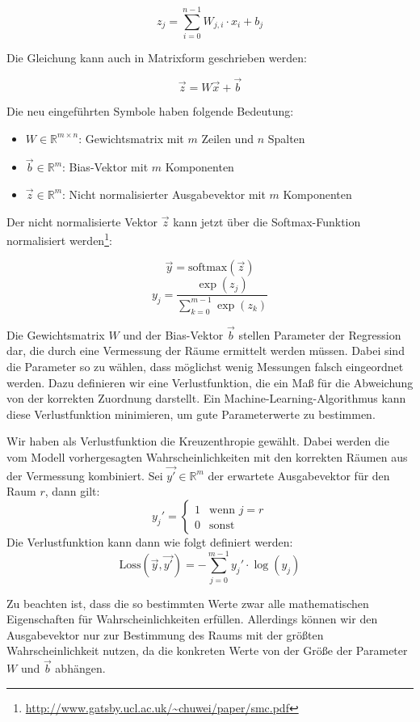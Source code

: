 $$ z_j = \sum_{i=0}^{n-1} W_{j,i} \cdot x_i + b_j $$

Die Gleichung kann auch in Matrixform geschrieben werden:

$$ \vec{z} = W \vec{x} + \vec{b} $$

Die neu eingeführten Symbole haben folgende Bedeutung:
\begin{itemize}
	\item $W \in \mathbb{R}^{m \times n}$: Gewichtsmatrix mit $m$ Zeilen und $n$ Spalten
	\item $\vec{b} \in \mathbb{R}^m$: Bias-Vektor mit $m$ Komponenten
	\item $\vec{z} \in \mathbb{R}^m$: Nicht normalisierter Ausgabevektor mit $m$ Komponenten
\end{itemize}

Der nicht normalisierte Vektor $\vec{z}$ kann jetzt über die Softmax-Funktion normalisiert
werden\footnote{\url{http://www.gatsby.ucl.ac.uk/~chuwei/paper/smc.pdf}}:

$$ \vec{y} = \text{softmax}(\vec{z}) $$
$$ y_j = \frac{\exp(z_j)}{\sum_{k=0}^{m-1} \exp(z_k) } $$

Die Gewichtsmatrix $W$ und der Bias-Vektor $\vec{b}$ stellen Parameter der Regression dar,
die durch eine Vermessung der Räume ermittelt werden müssen. Dabei sind die Parameter so
zu wählen, dass möglichst wenig Messungen falsch eingeordnet werden. Dazu definieren wir
eine Verlustfunktion, die ein Maß für die Abweichung von der korrekten Zuordnung darstellt.
Ein Machine-Learning-Algorithmus kann diese Verlustfunktion minimieren, um
gute Parameterwerte zu bestimmen.

Wir haben als Verlustfunktion die Kreuzenthropie gewählt. Dabei werden die vom Modell vorhergesagten
Wahrscheinlichkeiten mit den korrekten Räumen aus der Vermessung kombiniert.
Sei $\vec{y'} \in \mathbb{R}^m$ der erwartete Ausgabevektor für den Raum $r$, dann gilt:
\[
y_j' = 
\begin{cases}
	1 & \text{wenn } j = r  \\ 
	0 & \text{sonst}
\end{cases}
\]
Die Verlustfunktion kann dann wie folgt definiert werden:
$$ \text{Loss}(\vec{y}, \vec{y'}) = - \sum_{j=0}^{m-1} y_j' \cdot \log(y_j) $$

Zu beachten ist, dass die so bestimmten Werte zwar alle mathematischen
Eigenschaften für Wahrscheinlichkeiten erfüllen. Allerdings können wir den Ausgabevektor
nur zur Bestimmung des Raums mit der größten Wahrscheinlichkeit nutzen,
da die konkreten Werte von der Größe der Parameter $W$ und $\vec{b}$ abhängen.

